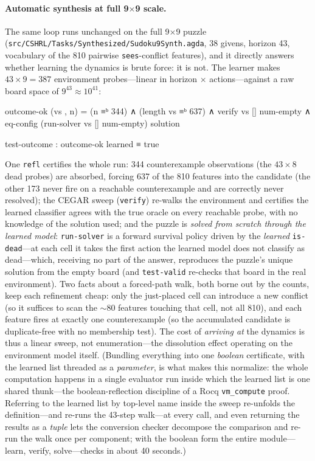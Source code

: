 \documentclass[9pt,a4paper]{article}
\newcommand{\fpath}[1]{\nolinkurl{#1}}
\theoremstyle{plain}
\theoremstyle{definition}
\theoremstyle{remark}
\begin{document}
\paragraph{Automatic synthesis at full 9$\times$9 scale.}  The same loop runs unchanged on the full 9$\times$9 puzzle (\fpath{src/CSHRL/Tasks/Synthesized/Sudoku9Synth.agda}, 38 givens, horizon 43, vocabulary of the 810 pairwise \texttt{sees}-conflict features), and it directly answers whether learning the dynamics is brute force: it is not.  The learner makes $43 \times 9 = 387$ environment probes---linear in horizon $\times$ actions---against a raw board space of $9^{43} \approx 10^{41}$:
\begin{spec}
outcome-ok (vs , n) = (n ≡ᵇ 344) ∧ (length vs ≡ᵇ 637)
                    ∧ verify vs [] num-empty
                    ∧ eq-config (run-solver vs [] num-empty) solution

test-outcome : outcome-ok learned ≡ true
\end{spec}
One \texttt{refl} certifies the whole run: 344 counterexample observations (the $43 \times 8$ dead probes) are absorbed, forcing 637 of the 810 features into the candidate (the other 173 never fire on a reachable counterexample and are correctly never resolved); the CEGAR sweep (\texttt{verify}) re-walks the environment and certifies the learned classifier agrees with the true oracle on every reachable probe, with no knowledge of the solution used; and the puzzle is \emph{solved from scratch through the learned model}: \texttt{run-solver} is a forward survival policy driven by the \emph{learned} \texttt{is-dead}---at each cell it takes the first action the learned model does not classify as dead---which, receiving no part of the answer, reproduces the puzzle's unique solution from the empty board (and \texttt{test-valid} re-checks that board in the real environment).  Two facts about a forced-path walk, both borne out by the counts, keep each refinement cheap: only the just-placed cell can introduce a new conflict (so it suffices to scan the $\sim$80 features touching that cell, not all 810), and each feature fires at exactly one counterexample (so the accumulated candidate is duplicate-free with no membership test).  The cost of \emph{arriving at} the dynamics is thus a linear sweep, not enumeration---the dissolution effect operating on the environment model itself.  (Bundling everything into one \emph{boolean} certificate, with the learned list threaded as a \emph{parameter}, is what makes this normalize: the whole computation happens in a single evaluator run inside which the learned list is one shared thunk---the boolean-reflection discipline of a Rocq \texttt{vm\_compute} proof.  Referring to the learned list by top-level name inside the sweep re-unfolds the definition---and re-runs the 43-step walk---at every call, and even returning the results as a \emph{tuple} lets the conversion checker decompose the comparison and re-run the walk once per component; with the boolean form the entire module---learn, verify, solve---checks in about 40 seconds.)
\end{document}
